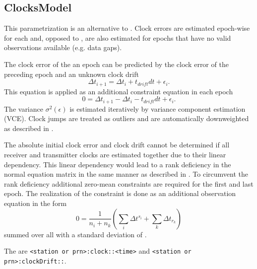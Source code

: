 \subsection{ClocksModel}\label{gnssParametrizationType:clocksModel}
This parametrization is an alternative to .
Clock errors are estimated epoch-wise for each 
and, opposed to , are also estimated for epochs
that have no valid observations available (e.g. data gaps).

The clock error of the an epoch can be predicted by the clock error
of the preceding epoch and an unknown clock drift
\begin{equation}
  \Delta t_{i+1} = \Delta t_{i} + t_{drift} dt + \epsilon_i.
\end{equation}
This equation is applied as an additional constraint equation in each epoch
\begin{equation}
  0 = \Delta t_{i+1} - \Delta t_{i} - t_{drift} dt + \epsilon_i.
\end{equation}
The variance $\sigma^2(\epsilon)$ is estimated iteratively by variance component estimation (VCE).
Clock jumps are treated as outliers and are automatically downweighted as described in
.

The absolute initial clock error and clock drift cannot be determined if all receiver
and transmitter clocks are estimated together due to their linear dependency.
This linear dependency would lead to a rank deficiency in the normal equation matrix in the same
manner as described in .
To circumvent the rank deficiency additional zero-mean constraints are required for the first and last epoch.
The realization of the constraint is done as an additional observation equation in the form
\begin{equation}
  0 = \frac{1}{n_i + n_k} (\sum_i \Delta t^{s_i} + \sum_k \Delta t_{r_k})
\end{equation}
summed over all 
with a standard deviation of .

The  are \verb|<station or prn>:clock::<time>|
and \verb|<station or prn>:clockDrift::|.


